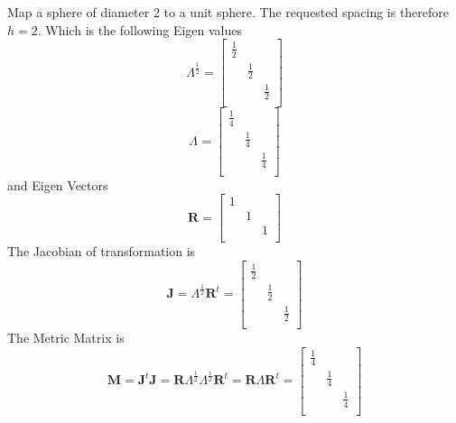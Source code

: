 \documentclass{article}
\begin{document}
Map a sphere of diameter 2 to a unit sphere. 
The requested spacing is therefore $h=2$.
Which is the following Eigen values
\begin{equation}
 \Lambda^\frac{1}{2}=\left[
 \begin{array}{ccc}
   \frac{1}{2}&&\\
   &\frac{1}{2}&\\
   &&\frac{1}{2}\\
 \end{array}\right]
\end{equation}
\begin{equation}
 \Lambda=\left[
 \begin{array}{ccc}
   \frac{1}{4}&&\\
   &\frac{1}{4}&\\
   &&\frac{1}{4}\\
 \end{array}\right]
\end{equation}
and Eigen Vectors
\begin{equation}
 \mathbf{R}=\left[
 \begin{array}{ccc}
   1&&\\
   &1&\\
   &&1\\
 \end{array}\right]
\end{equation}
The Jacobian of transformation is
\begin{equation}
 \mathbf{J}=\Lambda^\frac{1}{2}\mathbf{R}^t=\left[
 \begin{array}{ccc}
   \frac{1}{2}&&\\
   &\frac{1}{2}&\\
   &&\frac{1}{2}\\
 \end{array}\right]
\end{equation}
The Metric Matrix is 
\begin{equation}
 \mathbf{M}=
  \mathbf{J}^t\mathbf{J}=
  \mathbf{R}\Lambda^\frac{1}{2}\Lambda^\frac{1}{2}\mathbf{R}^t=
  \mathbf{R}\Lambda\mathbf{R}^t=
  \left[\begin{array}{ccc}
   \frac{1}{4}&&\\
   &\frac{1}{4}&\\
   &&\frac{1}{4}\\
 \end{array}\right]
\end{equation}
\end{document}
